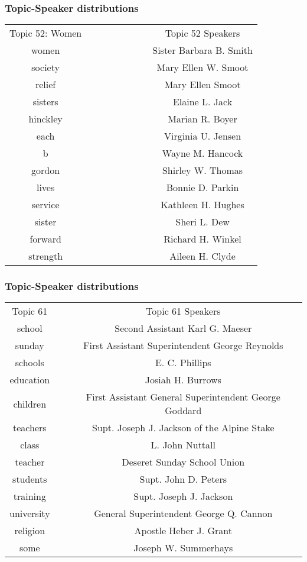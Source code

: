 \documentclass{beamer}
\begin{document}
\begin{frame}
  \frametitle{Topic-Speaker distributions}
  \begin{tabular}{|c|c|c|}
	Topic 52: Women &\ \ \ \ \ \ \ \ \ \ \ &Topic 52 Speakers \\
	women&&Sister Barbara B. Smith \\
	society&&Mary Ellen W. Smoot \\
	relief&&Mary Ellen Smoot \\
	sisters&&Elaine L. Jack \\
	hinckley&&Marian R. Boyer \\
	each&&Virginia U. Jensen \\
	b&&Wayne M. Hancock \\
	gordon&&Shirley W. Thomas \\
	lives&&Bonnie D. Parkin \\
	service&&Kathleen H. Hughes \\
	sister&&Sheri L. Dew \\
	forward&&Richard H. Winkel \\
	strength&&Aileen H. Clyde \\
  \end{tabular}
\end{frame}
\begin{frame}
  \frametitle{Topic-Speaker distributions}
  \begin{tabular}{|c|c|c|}
	Topic 61&&Topic 61 Speakers \\
	school&&Second Assistant Karl G. Maeser \\
	sunday&&First Assistant Superintendent George Reynolds \\
	schools&&E. C. Phillips \\
	education&&Josiah H. Burrows \\
	children&&First Assistant General Superintendent George Goddard\\
	teachers&&Supt. Joseph J. Jackson of the Alpine Stake\\
	class&&L. John Nuttall \\
	teacher&&Deseret Sunday School Union \\
	students&&Supt. John D. Peters \\
	training&&Supt. Joseph J. Jackson \\
	university&&General Superintendent George Q. Cannon \\
	religion&&Apostle Heber J. Grant \\
	some&&Joseph W. Summerhays \\
  \end{tabular}
\end{frame}
\end{document}
